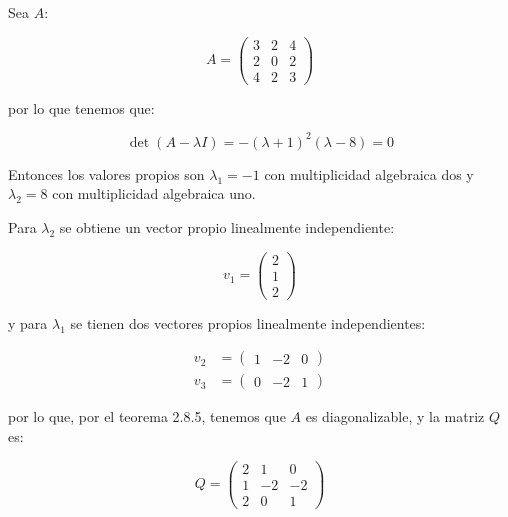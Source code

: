 		\begin{ejemplo}
			Sea $A$:

			\begin{equation*}
				A =
				\begin{pmatrix}
					3 & 2 & 4 \\
					2 & 0 & 2 \\
					4 & 2 & 3
				\end{pmatrix}
			\end{equation*}

			por lo que tenemos que:

			\begin{equation*}
				\det{(A - \lambda I)} = -(\lambda + 1)^2(\lambda - 8) = 0
			\end{equation*}

			Entonces los valores propios son $\lambda_1 = -1$ con multiplicidad algebraica dos y $\lambda_2 = 8$ con multiplicidad algebraica uno.

			Para $\lambda_2$ se obtiene un vector propio linealmente independiente:

			\begin{equation*}
				v_1 =
				\begin{pmatrix}
					2 \\
					1 \\
					2
				\end{pmatrix}
			\end{equation*}

			y para $\lambda_1$ se tienen dos vectores propios linealmente independientes:

			\begin{align*}
				v_2 &= \begin{pmatrix} 1 & -2 & 0 \end{pmatrix} \\
				v_3 &= \begin{pmatrix} 0 & -2 & 1 \end{pmatrix}
			\end{align*}

			por lo que, por el teorema 2.8.5, tenemos que $A$ es diagonalizable, y la matriz $Q$ es:

			\begin{equation*}
				Q =
				\begin{pmatrix}
					2 & 1 & 0 \\
					1 & -2 & -2 \\
					2 & 0 & 1
				\end{pmatrix}
			\end{equation*}


\end{ejemplo}
